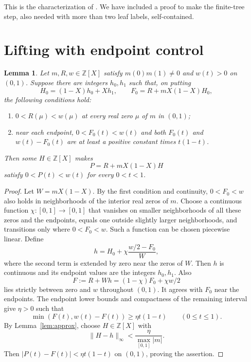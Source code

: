 \documentclass[11pt]{article}
\newtheorem{lemma}[theorem]{Lemma}
\theoremstyle{remark}
\newcommand{\Z}{\mathbb Z}
\begin{document}
This is the characterization of \cite[Theorem~3.6]{FGH2026}. We have included a proof to make the finite-tree step, also needed with more than two leaf labels, self-contained.

\section{Lifting with endpoint control}
\begin{lemma}\label{lem:weighted}
Let $m,R,w\in\Z[X]$ satisfy $m(0)m(1)\ne0$ and $w(t)>0$ on $(0,1)$. Suppose there are integers $h_0,h_1$ such that, on putting
\[
 H_0=(1-X)h_0+Xh_1,\qquad F_0=R+mX(1-X)H_0,
\]
the following conditions hold:

\begin{enumerate}
\item $0<R(\mu)<w(\mu)$ at every real zero $\mu$ of $m$ in $(0,1)$;
\item near each endpoint, $0<F_0(t)<w(t)$ and both $F_0(t)$ and $w(t)-F_0(t)$ are at least a positive constant times $t(1-t)$.
\end{enumerate}
Then some $H\in\Z[X]$ makes
\[
 P=R+mX(1-X)H
\]
satisfy $0<P(t)<w(t)$ for every $0<t<1$.
\end{lemma}
\begin{proof}
Let $W=mX(1-X)$. By the first condition and continuity, $0<F_0<w$ also holds in neighborhoods of the interior real zeros of $m$. Choose a continuous function $\chi:[0,1]\to[0,1]$ that vanishes on smaller neighborhoods of all these zeros and the endpoints, equals one outside slightly larger neighborhoods, and transitions only where $0<F_0<w$. Such a function can be chosen piecewise linear. Define
\[
 h=H_0+\chi\frac{w/2-F_0}{W},
\]
where the second term is extended by zero near the zeros of $W$. Then $h$ is continuous and its endpoint values are the integers $h_0,h_1$. Also
\[
 F:=R+Wh=(1-\chi)F_0+\chi w/2
\]
lies strictly between zero and $w$ throughout $(0,1)$. It agrees with $F_0$ near the endpoints. The endpoint lower bounds and compactness of the remaining interval give $\eta>0$ such that
\[
 \min(F(t),w(t)-F(t))\ge\eta t(1-t)\qquad(0\le t\le1).
\]
By Lemma~\ref{lem:approx}, choose $H\in\Z[X]$ with
\[
 \|H-h\|_\infty<\frac{\eta}{\max_{[0,1]}|m|}.
\]
Then $|P(t)-F(t)|<\eta t(1-t)$ on $(0,1)$, proving the assertion.
\end{proof}
\end{document}
